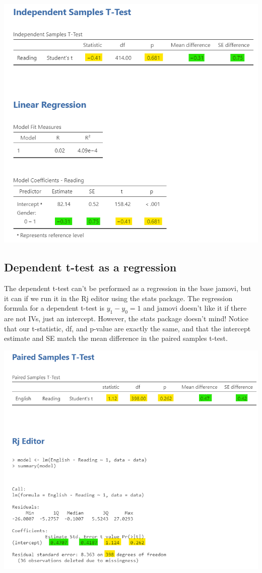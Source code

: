 \documentclass[
]{book}
\begin{document}
\includegraphics{images/14-regression-wrap-up/t-test.png}

\hypertarget{dependent-t-test-as-a-regression}{%
\subsection{Dependent t-test as a regression}\label{dependent-t-test-as-a-regression}}

The dependent t-test can't be performed as a regression in the base jamovi, but it can if we run it in the Rj editor using the stats package. The regression formula for a dependent t-test is \(y_1 -y_0 = 1\) and jamovi doesn't like it if there are not IVs, just an intercept. However, the stats package doesn't mind! Notice that our t-statistic, df, and p-value are exactly the same, and that the intercept estimate and SE match the mean difference in the paired samples t-test.

\includegraphics{images/14-regression-wrap-up/dependent_t-test.png}
\end{document}
